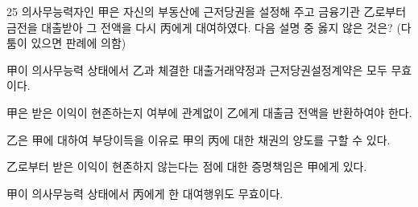\begin{question}{25}
의사무능력자인 甲은 자신의 부동산에 근저당권을 설정해 주고 금융기관 乙로부터 금전을 대출받아 그 전액을 다시 丙에게 대여하였다. 다음 설명 중 옳지 않은 것은? (다툼이 있으면 판례에 의함)
\begin{choices}
  \item 甲이 의사무능력 상태에서 乙과 체결한 대출거래약정과 근저당권설정계약은 모두 무효이다.
  \item 甲은 받은 이익이 현존하는지 여부에 관계없이 乙에게 대출금 전액을 반환하여야 한다.
  \item 乙은 甲에 대하여 부당이득을 이유로 甲의 丙에 대한 채권의 양도를 구할 수 있다.
  \item 乙로부터 받은 이익이 현존하지 않는다는 점에 대한 증명책임은 甲에게 있다.
  \item 甲이 의사무능력 상태에서 丙에게 한 대여행위도 무효이다.
\end{choices}
\end{question}
